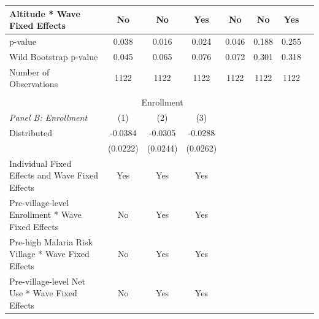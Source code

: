\documentclass[fleqn,11pt]{article}
\begin{document}
\begin{table}[h]
\begin{adjustbox}{max width=\textwidth}
\begin{threeparttable}
\begin{tabular}{l*{7}{c}}
Altitude * Wave Fixed Effects&          No         &          No         &         Yes        &     No         &          No         &         Yes        \\
\hline
p-value&               0.038         &       0.016         &       0.024 &     0.046         &       0.188         &       0.255              \\
Wild Bootstrap p-value &          0.045         &       0.065         &       0.076         &       0.072         &       0.301         &       0.318       \\
Number of Observations        &        1122         &        1122         &        1122         &        1122         &        1122         &        1122         \\
\\
                      &\multicolumn{3}{c}{Enrollment} &&& \\  \cmidrule(lr){2-4} 
                    
        \textit{Panel B: Enrollment}                   &\multicolumn{1}{c}{(1)}&\multicolumn{1}{c}{(2)}&\multicolumn{1}{c}{(3)} &&& \\
\hline
Distributed         &     -0.0384         &     -0.0305         &     -0.0288         \\
                    &    (0.0222)         &    (0.0244)         &    (0.0262)         \\

Individual Fixed Effects and Wave Fixed Effects &         Yes         &         Yes         &         Yes        &&& \\

Pre-village-level Enrollment * Wave Fixed Effects&          No         &         Yes         &         Yes        &&& \\

Pre-high Malaria Risk Village * Wave Fixed Effects&          No         &          Yes         &         Yes        &&& \\

Pre-village-level Net Use * Wave Fixed Effects&          No         &          Yes         &         Yes        &&& \\


\end{tabular}
\end{threeparttable}
\end{adjustbox}
\end{table}
\end{document}
